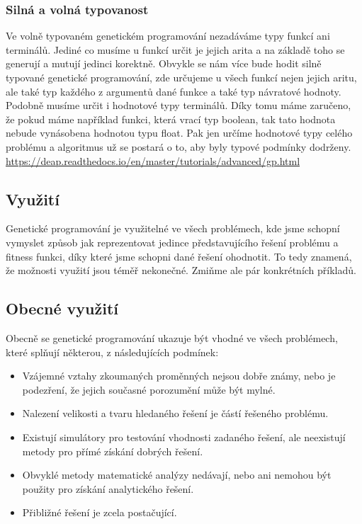 \subsubsection{Silná a volná typovanost}
Ve volně typovaném genetickém programování nezadáváme typy funkcí ani terminálů. Jediné co musíme u funkcí určit je jejich arita a na základě toho se generují a mutují jedinci korektně.
Obvykle se nám více bude hodit silně typované genetické programování, zde určujeme u všech funkcí nejen jejich aritu, ale také typ každého z argumentů dané funkce a také typ návratové hodnoty.
Podobně musíme určit i hodnotové typy terminálů. Díky tomu máme zaručeno, že pokud máme například funkci, která vrací typ boolean, tak tato hodnota nebude vynásobena hodnotou typu float. 
Pak jen určíme hodnotové typy celého problému a algoritmus už se postará o to, aby byly typové podmínky dodrženy.
\url{https://deap.readthedocs.io/en/master/tutorials/advanced/gp.html}


\subsection{Využití}
Genetické programování je využitelné ve všech problémech, kde jsme schopní vymyslet způsob jak reprezentovat jedince představujícího řešení problému a fitness funkci, díky které jsme schopni dané řešení ohodnotit.
To tedy znamená, že možnosti využití jsou téměř nekonečné. Zmiňme ale pár konkrétních příkladů. 

\subsection{Obecné využití}
Obecně se genetické programování ukazuje být vhodné ve všech problémech, které splňují některou, z následujících podmínek:

\begin{itemize}
    \item Vzájemné vztahy zkoumaných proměnných nejsou dobře známy, nebo je podezření, že jejich současné porozumění může být mylné.
    \item Nalezení velikosti a tvaru hledaného řešení je částí řešeného problému.
    \item Existují simulátory pro testování vhodnosti zadaného řešení, ale neexistují metody pro přímé získání dobrých řešení.
    \item Obvyklé metody matematické analýzy nedávají, nebo ani nemohou být použity pro získání analytického řešení.
    \item Přibližné řešení je zcela postačující.
    
\end{itemize}



